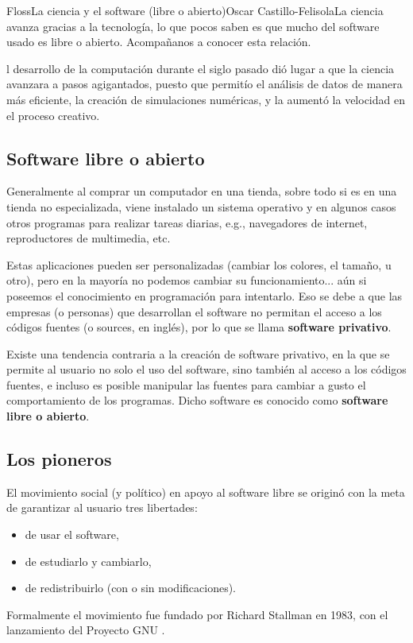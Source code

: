 

\begin{article}[2]{Floss}{La ciencia y el software (libre o abierto)}{Oscar Castillo-Felisola}{La ciencia avanza gracias a la tecnolog\'ia, lo que pocos saben es que mucho del software usado es libre o abierto. Acompa\~nanos a conocer esta relaci\'on.}
  
l desarrollo de la computaci\'on durante el siglo pasado di\'o lugar a que la ciencia avanzara a pasos agigantados, puesto que permit\'io el an\'alisis de datos de manera m\'as eficiente, la creaci\'on de simulaciones num\'ericas, y la aument\'o la velocidad en el proceso creativo.



\subsection{Software libre o abierto}

Generalmente al comprar un computador en una tienda, sobre todo si es en una tienda no especializada, viene instalado un sistema operativo y en algunos casos otros programas para realizar tareas diarias, e.g., navegadores de internet, reproductores de multimedia, etc. 

Estas aplicaciones pueden ser personalizadas (cambiar los colores, el tama\~no, u otro), pero en la mayor\'ia no podemos cambiar su funcionamiento... a\'un si poseemos el conocimiento en programaci\'on para intentarlo. Eso se debe a que las empresas (o personas) que desarrollan el software no permitan el acceso a los c\'odigos fuentes (o sources, en ingl\'es), por lo que se llama {\bf software privativo}.

Existe una tendencia contraria a la creaci\'on de software privativo, en la que se permite al usuario no solo el uso del software, sino tambi\'en al acceso a los c\'odigos fuentes, e incluso es posible manipular las fuentes para cambiar a gusto el comportamiento de los programas. Dicho software es conocido como {\bf software libre o abierto}.

\subsection{Los pioneros}

El movimiento social (y pol\'itico)  en apoyo al software libre se origin\'o con la meta de garantizar al usuario tres libertades:
\begin{itemize}%
\item de usar el software,
\item de estudiarlo y cambiarlo,
\item de redistribuirlo (con o sin modificaciones).
\end{itemize}%
Formalmente el movimiento fue fundado por Richard Stallman en 1983, con el lanzamiento del Proyecto GNU .


\end{article}
